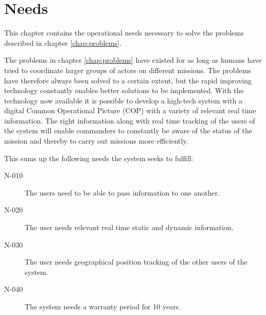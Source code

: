 \chapter{Needs}
This chapter contains the operational needs necessary to solve the problems described in chapter \ref{chap:problems}. 

The problems in chapter \ref{chap:problems} have existed for as long as humans have tried to coordinate larger groups of actors on different missions. The problems have therefore always been solved to a certain extent, but the rapid improving technology constantly enables better solutions to be implemented. With the technology now available it is possible to develop a high-tech system with a digital Common Operational Picture (COP) with a variety of relevant real time information. The right information along with real time tracking of the users of the system will enable commanders to constantly be aware of the status of the mission and thereby to carry out missions more efficiently. 

This sums up the following needs the system seeks to fulfill:

\begin{description}
\item[N-010] The users need to be able to pass information to one another. 
\item[N-020] The user needs relevant real time static and dynamic information. 
\item[N-030] The user needs geographical position tracking of the other users of the system.
\item[N-040] The system needs a warranty period for 10 years. 
\end{description}

